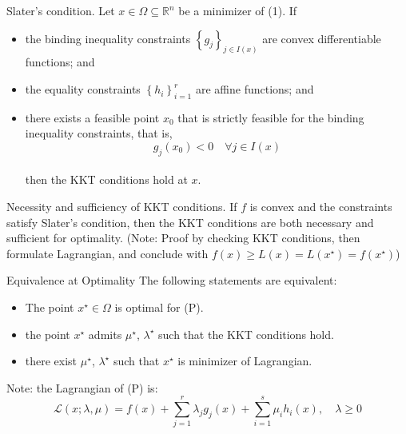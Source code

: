 \begin{theorem}[L7.4]{Slater's condition.}
    Let $x \in \Omega \subseteq \mathbb{R}^n$ be a minimizer of (1). If
    \begin{itemize}[leftmargin=*]
        \item the binding inequality constraints $\left\{g_j\right\}_{j \in I(x)}$ are convex differentiable functions; and 
        \item the equality constraints $\left\{h_i\right\}_{i=1}^r$ are affine functions; and
        \item there exists a feasible point $x_0$ that is strictly feasible for the binding inequality constraints, that is,
        \vspace{-4pt}\\
        $$
        g_j\left(x_0\right)<0 \quad \forall j \in I(x)
        $$
        \vspace{-4pt}\\
        then the KKT conditions hold at $x$.
    \end{itemize}
\end{theorem}

\begin{theorem}[L7.5]{Necessity and sufficiency of KKT conditions.}
    If $f$ is convex and the constraints satisfy Slater's condition, then the KKT conditions are both necessary and sufficient for optimality.
    (Note: Proof by checking KKT conditions, then formulate Lagrangian, and conclude with $f(x) \geq L(x) = L(x^\star) = f(x^\star)$)
\end{theorem}


\begin{remark}[L8.1]{Equivalence at Optimality}
    The following statements are equivalent:
    \begin{itemize}[leftmargin=*]
        \item The point $x^\star\in \Omega$ is optimal for (P).
        \item the point $x^\star$ admits $\mu^\star$, $\lambda^\star$ such that the KKT conditions hold.
        \item there exist $\mu^\star$, $\lambda^\star$ such that $x^\star$ is minimizer of Lagrangian.
    \end{itemize}
    Note: the Lagrangian of (P) is:
    \vspace{-4pt}\\
    $$
    \mathcal{L}(x ; \lambda, \mu)=f(x)+\sum_{j=1}^{r} \lambda_{j} g_{j}(x)+\sum_{i=1}^{s} \mu_{i} h_{i}(x), \quad \lambda \geq 0
    $$
    \vspace{-4pt}
\end{remark}

